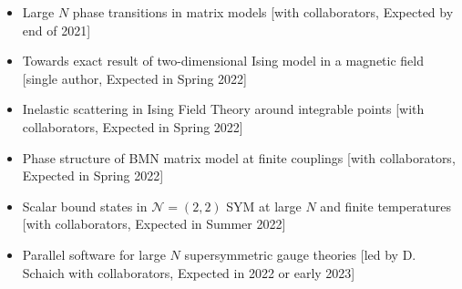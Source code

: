 \renewcommand{\arraystretch}{1.1}

	\begin{itemize} 
	\item Large $N$ phase transitions in matrix models [with collaborators, Expected by end of 2021] 
	 \item Towards exact result of two-dimensional Ising model in a magnetic field [single author, Expected in Spring 2022] 
	 \item Inelastic scattering in Ising Field Theory around integrable points [with collaborators, Expected in Spring 2022] 
	 \item Phase structure of BMN matrix model at finite couplings [with collaborators, Expected in Spring 2022] 
	 \item Scalar bound states in $\mathcal{N}=(2,2)$ SYM at large $N$ and finite temperatures [with collaborators, Expected in Summer 2022] 
	 \item Parallel software for large $N$ supersymmetric gauge theories [led by D. Schaich with collaborators, Expected in 2022 or early 2023] 
	 \end{itemize}
